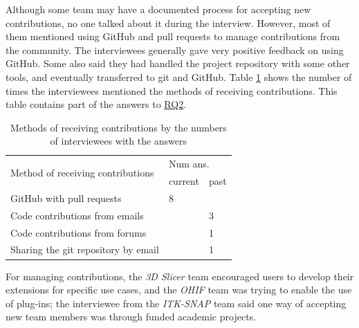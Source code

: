 \documentclass[3p, 12pt,authoryear]{elsarticle}
\begin{document}

Although some team may have a documented process for accepting new
contributions, no one talked about it during the interview. However, most of
them mentioned using GitHub and pull requests to manage contributions from the
community. The interviewees generally gave very positive feedback on using
GitHub. Some also said they had handled the project repository with some other
tools, and eventually transferred to git and GitHub. Table
\ref{tab_method_receive_contributions} shows the number of times the
interviewees mentioned the methods of receiving contributions. This table
contains part of the answers to \hyperlink{rq2}{RQ2}.

\begin{table}[ht]
\centering
\begin{tabular}{lll}
\hline
\multirow{2}{*}{Method of receiving contributions} & \multicolumn{2}{l}{Num ans.} \\ \cline{2-3} 
 & current & past \\ \hline
GitHub with pull requests & 8 & \\
Code contributions from emails & & 3 \\
Code contributions from forums & & 1 \\
Sharing the git repository by email & & 1 \\ \hline
\end{tabular}
\caption{\label{tab_method_receive_contributions}Methods of receiving
contributions by the numbers of interviewees with the answers}
\end{table}

For managing contributions, the \textit{3D Slicer} team encouraged users to
develop their extensions for specific use cases, and the \textit{OHIF} team was
trying to enable the use of plug-ins; the interviewee from the \textit{ITK-SNAP}
team said one way of accepting new team members was through funded academic
projects.
\end{document}
